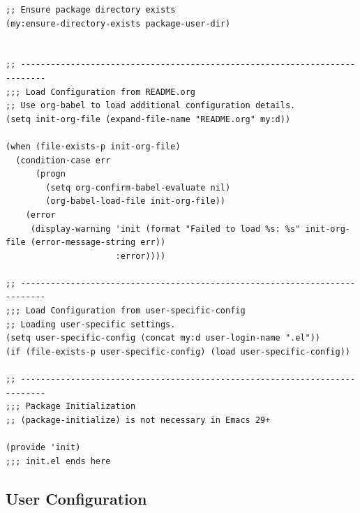 \documentclass[11pt]{article}
\begin{document}
\begin{verbatim}
;; Ensure package directory exists
(my:ensure-directory-exists package-user-dir)


;; ---------------------------------------------------------------------------
;;; Load Configuration from README.org
;; Use org-babel to load additional configuration details.
(setq init-org-file (expand-file-name "README.org" my:d))

(when (file-exists-p init-org-file)
  (condition-case err
      (progn
        (setq org-confirm-babel-evaluate nil)
        (org-babel-load-file init-org-file))
    (error
     (display-warning 'init (format "Failed to load %s: %s" init-org-file (error-message-string err))
                      :error))))

;; ---------------------------------------------------------------------------
;;; Load Configuration from user-specific-config
;; Loading user-specific settings.
(setq user-specific-config (concat my:d user-login-name ".el"))
(if (file-exists-p user-specific-config) (load user-specific-config))

;; ---------------------------------------------------------------------------
;;; Package Initialization
;; (package-initialize) is not necessary in Emacs 29+

(provide 'init)
;;; init.el ends here
\end{verbatim}
\subsection{User Configuration}
\label{sec:org56c04e3}
\end{document}
